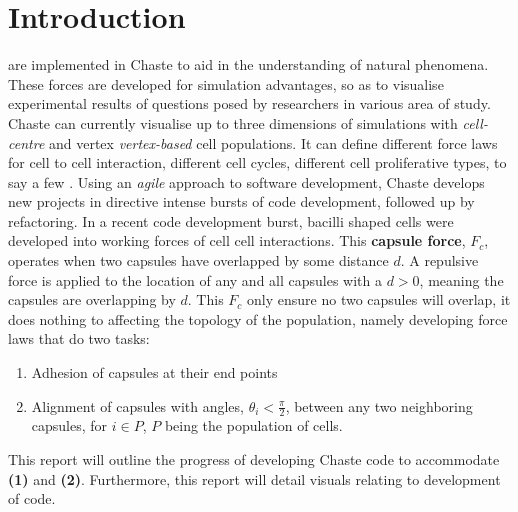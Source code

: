 \documentclass[journal, a4paper]{IEEEtran}
\begin{document}
\section{Introduction}
	 are implemented in Chaste to aid in the understanding of natural phenomena. These forces are developed for simulation advantages, so as to visualise experimental results of questions posed by researchers in various area of study. Chaste can currently visualise up to three dimensions of simulations with \textit{cell-centre} and vertex \textit{vertex-based} cell populations. It can define different force laws for cell to cell interaction, different cell cycles, different cell proliferative types, to say a few \cite{ChasteCell}. Using an \textit{agile} approach to software development, Chaste develops new projects in directive intense bursts of code development, followed up by refactoring. In a recent code development burst, bacilli shaped cells were developed into working forces of cell cell interactions. This \textbf{capsule force}, $F_c$, operates when two capsules have overlapped by some distance $d$. A repulsive force is applied to the location of any and all capsules with a $d > 0$, meaning the capsules are overlapping by $d$. This $F_c$ only ensure no two capsules will overlap, it does nothing to affecting the topology of the population, namely developing force laws that do two tasks:
	\begin{enumerate}
	    \item Adhesion of capsules at their end points
	    \item Alignment of capsules with angles, $\theta_i < \frac{\pi}{2}$, between any two neighboring capsules, for $i\in P$, $P$ being the population of cells.
	\end{enumerate}
    This report will outline the progress of developing Chaste code to accommodate \textbf{(1)} and \textbf{(2)}. Furthermore, this report will detail visuals relating to development of code. 
\end{document}
